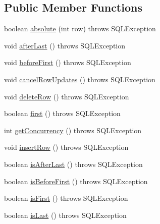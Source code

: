\subsection*{Public Member Functions}
\begin{DoxyCompactItemize}
\item 
boolean \mbox{\hyperlink{classcom_1_1mysql_1_1jdbc_1_1_updatable_result_set_ae6cbce4543dd7fd0006429895feb1252}{absolute}} (int row)  throws S\+Q\+L\+Exception 
\item 
void \mbox{\hyperlink{classcom_1_1mysql_1_1jdbc_1_1_updatable_result_set_aff9351c1dacdf8d0a381f3266aca18ac}{after\+Last}} ()  throws S\+Q\+L\+Exception 
\item 
void \mbox{\hyperlink{classcom_1_1mysql_1_1jdbc_1_1_updatable_result_set_a517136f9be65445c0d45a3a4bd020955}{before\+First}} ()  throws S\+Q\+L\+Exception 
\item 
void \mbox{\hyperlink{classcom_1_1mysql_1_1jdbc_1_1_updatable_result_set_a0d0f5404555c896fc24a8ffd4605f7a7}{cancel\+Row\+Updates}} ()  throws S\+Q\+L\+Exception 
\item 
void \mbox{\hyperlink{classcom_1_1mysql_1_1jdbc_1_1_updatable_result_set_a921d48d8e5c7adfde7518475024d822f}{delete\+Row}} ()  throws S\+Q\+L\+Exception 
\item 
boolean \mbox{\hyperlink{classcom_1_1mysql_1_1jdbc_1_1_updatable_result_set_a190d77a54225de646c3dbe21fc936b16}{first}} ()  throws S\+Q\+L\+Exception 
\item 
int \mbox{\hyperlink{classcom_1_1mysql_1_1jdbc_1_1_updatable_result_set_a6b38ea36a24339a9e7a0717217178d73}{get\+Concurrency}} ()  throws S\+Q\+L\+Exception 
\item 
void \mbox{\hyperlink{classcom_1_1mysql_1_1jdbc_1_1_updatable_result_set_aef041f8d9d0778083716fc26652648fa}{insert\+Row}} ()  throws S\+Q\+L\+Exception 
\item 
boolean \mbox{\hyperlink{classcom_1_1mysql_1_1jdbc_1_1_updatable_result_set_a065b1afc8c2a8c2370877d34ba2fc5ed}{is\+After\+Last}} ()  throws S\+Q\+L\+Exception 
\item 
boolean \mbox{\hyperlink{classcom_1_1mysql_1_1jdbc_1_1_updatable_result_set_acfe073e7f4e48053b2d5c7fe990fb4d4}{is\+Before\+First}} ()  throws S\+Q\+L\+Exception 
\item 
boolean \mbox{\hyperlink{classcom_1_1mysql_1_1jdbc_1_1_updatable_result_set_affb11700e1bbd19c5437135ac1b3b8f7}{is\+First}} ()  throws S\+Q\+L\+Exception 
\item 
boolean \mbox{\hyperlink{classcom_1_1mysql_1_1jdbc_1_1_updatable_result_set_a7815394f5a1b5ab882085c2dad44279d}{is\+Last}} ()  throws S\+Q\+L\+Exception 

\end{DoxyCompactItemize}
